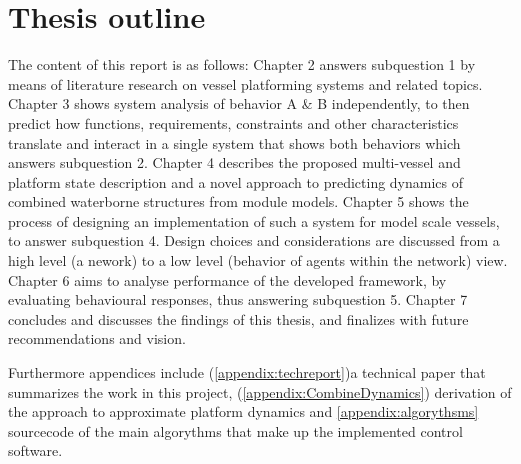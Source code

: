 \section{Thesis outline}
The content of this report is as follows:
Chapter 2 answers subquestion 1 by means of literature research on vessel platforming systems and related topics. 
Chapter 3 shows system analysis of behavior A \& B independently, to then predict how functions, requirements, constraints and other characteristics translate and interact in a single system that shows both behaviors which answers subquestion 2.
Chapter 4 describes the proposed multi-vessel and platform state description and a novel approach to predicting dynamics of combined waterborne structures from module models.
Chapter 5 shows the process of designing an implementation of such a system for model scale vessels, to answer subquestion 4. Design choices and considerations are discussed from a high level (a nework) to a low level (behavior of agents within the network) view. 
Chapter 6 aims to analyse performance of the developed framework, by evaluating behavioural responses, thus answering subquestion 5.
Chapter 7 concludes and discusses the findings of this thesis, and finalizes with future recommendations and vision.

Furthermore appendices include (\ref{appendix:techreport})a technical paper that summarizes the work in this project, (\ref{appendix:CombineDynamics}) derivation of the approach to approximate platform dynamics and \ref{appendix:algorythsms} sourcecode of the main algorythms that make up the implemented control software. 

%
